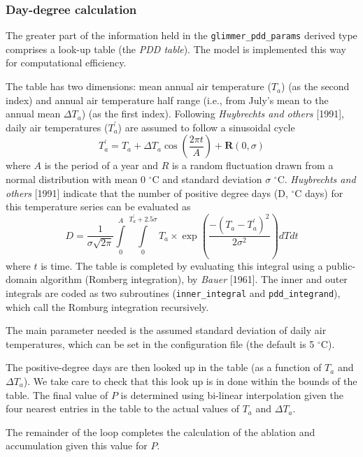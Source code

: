 \subsubsection{Day-degree calculation}
%
The greater part of the information held in the \texttt{glimmer\_pdd\_params}
derived type comprises a look-up table (the \emph{PDD table}). The model is
implemented this way for computational efficiency.

The table has two dimensions: mean annual air temperature ($T_a$)
(as the second index) and annual air temperature half range (i.e.,
from July's mean to the annual mean $\Delta T_a$) (as the first
index).  Following \emph{Huybrechts and others} [1991], daily air
temperatures ($T_a^\prime$) are assumed to follow a sinusoidal
cycle
\begin{equation}
    T_a^\prime = T_a + \Delta T_a \cos \left( \frac{2 \pi t}{A}
    \right) + \textbf{R}(0,\sigma)
\end{equation}
where $A$ is the period of a year and $R$ is a random fluctuation
drawn from a normal distribution with mean 0 $^\circ$C and
standard deviation $\sigma$ $^\circ$C. \emph{Huybrechts and
others} [1991] indicate that the number of positive degree days
(D, $^\circ$C days) for this temperature series can be evaluated
as
\begin{equation}\label{pdd}
    D = \frac{1}{\sigma \sqrt{2 \pi}}
    \int\limits_0^A
    \int\limits_0^{T_a^\prime+2.5\sigma}
    T_a \times \exp \left( \frac{-(T_a-T_a^\prime)^2}{2 \sigma^2} \right) dT
    dt
\end{equation}
where $t$ is time.  The table is completed by evaluating this integral using a
public-domain algorithm (Romberg integration), by {\it Bauer} [1961]. The
inner and outer integrals are coded as two subroutines
(\texttt{inner\_integral} and \texttt{pdd\_integrand}), which call the Romburg
integration recursively.

The main parameter needed is the assumed standard deviation of
daily air temperatures, which can be set in the configuration file (the
default is 5 $^\circ $C). 

The positive-degree days are then looked up in the table (as a function of
$T_a$ and $\Delta T_a$). We take care to check that this look up is in done
within the bounds of the table.  The final value of $P$ is determined using
bi-linear interpolation given the four nearest entries in the table to the
actual values of $T_a$ and $\Delta T_a$.

The remainder of the loop completes the calculation of the
ablation and accumulation given this value for $P$.
%
